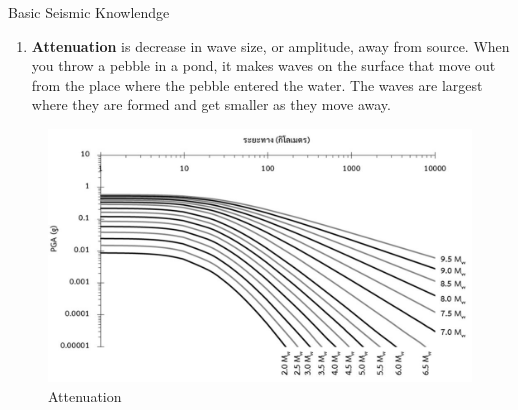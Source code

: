 \documentclass{beamer}
\newcounter{saveenumi}
\newcommand{\seti}{\setcounter{saveenumi}{\value{enumi}}}
\newcommand{\conti}{\setcounter{enumi}{\value{saveenumi}}}
\begin{document}
	\begin{frame}[t]{Basic Seismic Knowlendge}
		\begin{enumerate}
			\conti
			\item \textbf{Attenuation} is decrease in wave size, or amplitude, away from source. When you 
			throw a pebble in a pond, it makes waves on the surface that move out from the place where 
			the pebble entered the water. The waves are largest where they are formed and get smaller as 
			they move away.
			\seti
		\end{enumerate}
	
		\begin{figure}
			\centering
			\includegraphics[scale=0.35]{anu.jpg}
			\caption{Attenuation}
		\end{figure}
	
	\end{frame}
\end{document}
